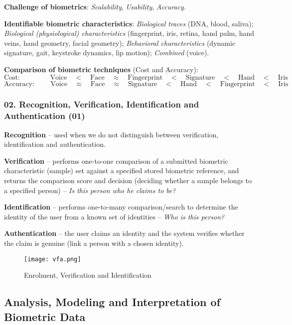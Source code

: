 \documentclass[a4paper]{article}
\begin{document}
      \textbf{Challenge of biometrics}: \emph{Scalability}, \emph{Usability}, \emph{Accuracy}.

      \textbf{Identifiable biometric characteristics}: \emph{Biological traces} (DNA, blood, saliva); \emph{Biological (physiological) characteristics} (fingerprint, iris, retina, hand palm, hand veins, hand geometry, facial geometry); \emph{Behavioral characteristics} (dynamic signature, gait, keystroke dynamics, lip motion); \emph{Combined} (voice).

      \textbf{Comparison of biometric techniques} (Cost and Accuracy):
      $$\text{Cost: }\qquad\qquad\text{Voice} \quad<\quad \text{Face} \quad\approx\quad \text{Fingerprint} \quad<\quad \text{Signature} \quad<\quad \text{Hand} \quad<\quad \text{Iris}$$
      $$\text{Accuracy: }\qquad\text{Voice} \quad\approx\quad \text{Face} \quad\approx\quad \text{Signature} \quad<\quad \text{Hand} \quad<\quad \text{Fingerprint} \quad<\quad \text{Iris}$$
      \newpage
    \subsubsection*{02. Recognition, Verification, Identification and Authentication (01)}
      \textbf{Recognition} -- used when we do not distinguish between verification, identification and authentication.

      \textbf{Verification} -- performs one-to-one comparison of a submitted biometric characteristic (sample) set against a specified stored biometric reference, and returns the comparison score and decision (deciding whether a sample belongs to a specified 
      person) -- \emph{Is this person who he claims to be?}

      \textbf{Identification} -- performs one-to-many comparison/search to determine the identity of the user from a known set of identities -- \emph{Who is this person?}

      \textbf{Authentication} -- the user claims an identity and the system verifies whether the claim is genuine (link a person with a chosen identity).

      \begin{figure}[htp]
        \centering
          \texttt{[image: vfa.png]}
          \caption{Enrolment, Verification and Identification}
          \label{fig:vfa}
      \end{figure}
  \subsection*{Analysis, Modeling and Interpretation of Biometric Data}
\end{document}
